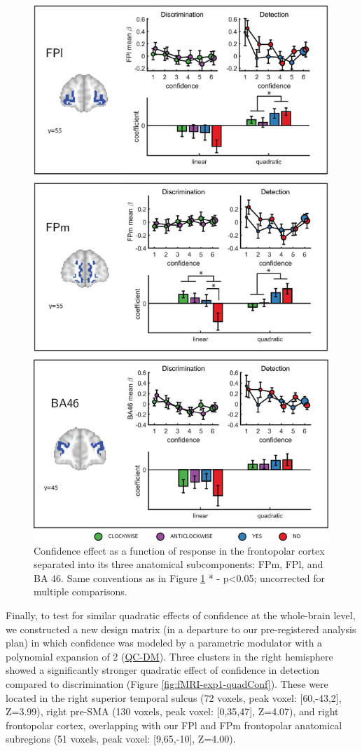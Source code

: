\documentclass[12pt,twoside]{reedthesis}
\begin{document}
\begin{figure}
\includegraphics[width=0.7\linewidth]{figure/fMRI/figure4} \caption[Effect of confidence in the frontopolar cortex]{Confidence effect as a function of response in the frontopolar cortex separated into its three anatomical subcomponents: FPm, FPl, and BA 46. Same conventions as in Figure \ref{fig:fMRI-exp1-FPl} * - p\textless0.05; uncorrected for multiple comparisons.}\label{fig:fMRI-exp1-FPl}
\end{figure}
Finally, to test for similar quadratic effects of confidence at the whole-brain level, we constructed a new design matrix (in a departure to our pre-registered analysis plan) in which confidence was modeled by a parametric modulator with a polynomial expansion of 2 (\protect\hyperlink{QC-DM}{QC-DM}). Three clusters in the right hemisphere showed a significantly stronger quadratic effect of confidence in detection compared to discrimination (Figure \ref{fig:fMRI-exp1-quadConf}). These were located in the right superior temporal sulcus (72 voxels, peak voxel: {[}60,-43,2{]}, Z=3.99), right pre-SMA (130 voxels, peak voxel: {[}0,35,47{]}, Z=4.07), and right frontopolar cortex, overlapping with our FPl and FPm frontopolar anatomical subregions (51 voxels, peak voxel: {[}9,65,-10{]}, Z=4.00).
\end{document}
